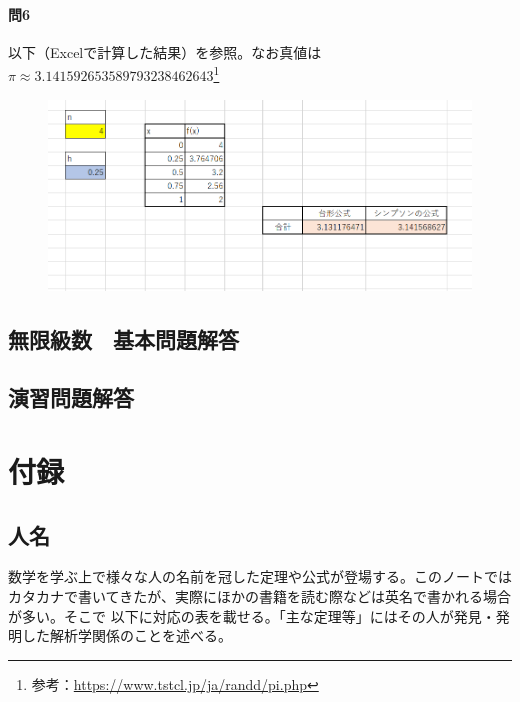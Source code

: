 \documentclass[a4j,dvipdfmx]{jsarticle}
\begin{document}
                    \paragraph{問6}以下（Excelで計算した結果）を参照。なお真値は$\pi\approx 3.141592653589793238462643$\footnote{参考：\url{https://www.tstcl.jp/ja/randd/pi.php}}
                    \begin{figure}[h]
                        \centering
                        \includegraphics[scale=0.5]{img/QuuNote/kihonmondai_ten.png}
                    \end{figure}
                

                        
        \clearpage
        \subsection{無限級数　基本問題解答}
        \clearpage
        \subsection{演習問題解答}
        \clearpage
        \color{black}
        \section{付録}
            \subsection{人名}
                数学を学ぶ上で様々な人の名前を冠した定理や公式が登場する。このノートではカタカナで書いてきたが、実際にほかの書籍を読む際などは英名で書かれる場合が多い。そこで
                以下に対応の表を載せる。「主な定理等」にはその人が発見・発明した解析学関係のことを述べる。
                
\end{document}
